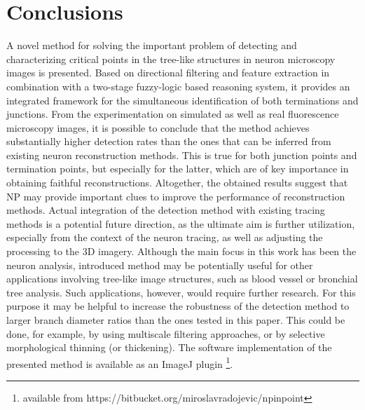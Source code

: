\section{Conclusions} 
\label{ch2:sec:conclusions}
A novel method for solving the important problem of detecting and characterizing critical points in the tree-like structures in neuron microscopy images is presented. Based on directional filtering and feature extraction in combination with a two-stage fuzzy-logic based reasoning system, it provides an integrated framework for the simultaneous identification of both terminations and junctions. From the experimentation on simulated as well as real fluorescence microscopy images, it is possible to conclude that the method achieves substantially higher detection rates than the ones that can be inferred from existing neuron reconstruction methods. This is true for both junction points and termination points, but especially for the latter, which are of key importance in obtaining faithful reconstructions. Altogether, the obtained results suggest that NP may provide important clues to improve the performance of reconstruction methods. Actual integration of the detection method with existing tracing methods is a potential future direction, as the ultimate aim is further utilization, especially from the context of the neuron tracing, as well as adjusting the processing to the 3D imagery. Although the main focus in this work has been the neuron analysis, introduced method may be potentially useful for other applications involving tree-like image structures, such as blood vessel or bronchial tree analysis. Such applications, however, would require further research. For this purpose it may be helpful to increase the robustness of the detection method to larger branch diameter ratios than the ones tested in this paper. This could be done, for example, by using multiscale filtering approaches, or by selective morphological thinning (or thickening). The software implementation of the presented method is available as an ImageJ plugin \footnote{available from https://bitbucket.org/miroslavradojevic/npinpoint}.